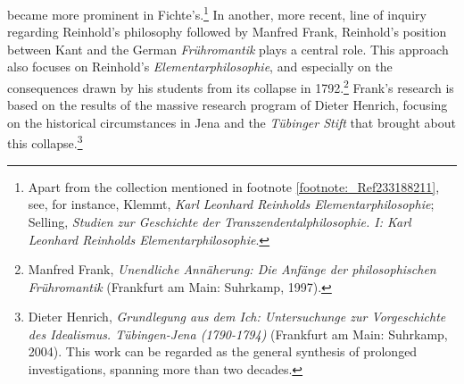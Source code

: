 became more prominent in Fichte's.\footnote{ Apart from the collection mentioned in footnote \ref{footnote:_Ref233188211}, see, for instance, Klemmt, \textit{Karl Leonhard Reinholds Elementarphilosophie}; Selling, \textit{Studien zur Geschichte der Transzendentalphilosophie. I: Karl Leonhard Reinholds Elementarphilosophie}. } In another, more recent, line of inquiry regarding Reinhold's philosophy followed by Manfred Frank, Reinhold's position between Kant and the German \textit{Fr\"{u}hromantik }plays a central role. This approach also focuses on Reinhold's \textit{Elementarphilosophie}, and especially on the consequences drawn by his students from its collapse in 1792.\footnote{ Manfred Frank, \textit{Unendliche Ann\"{a}herung: Die Anf\"{a}nge der philosophischen Fr\"{u}hromantik} (Frankfurt am Main: Suhrkamp, 1997). } Frank's research is based on the results of the massive research program of Dieter Henrich, focusing on the historical circumstances in Jena and the \textit{T\"{u}binger Stift} that brought about this collapse.\footnote{ Dieter Henrich, \textit{Grundlegung aus dem Ich: Untersuchunge zur Vorgeschichte des Idealismus. T\"{u}bingen{-}Jena (1790{-}1794) }(Frankfurt am Main: Suhrkamp, 2004). This work can be regarded as the general synthesis of prolonged investigations, spanning more than two decades. } 

